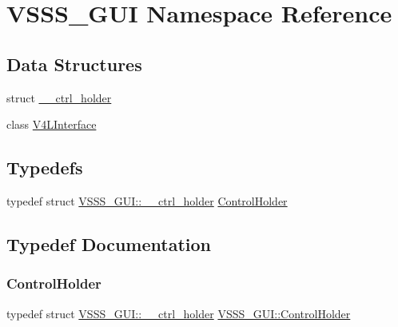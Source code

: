 \hypertarget{namespace_v_s_s_s___g_u_i}{}\section{V\+S\+S\+S\+\_\+\+G\+UI Namespace Reference}
\label{namespace_v_s_s_s___g_u_i}
\subsection*{Data Structures}
\begin{DoxyCompactItemize}
\item 
struct \hyperlink{struct_v_s_s_s___g_u_i_1_1____ctrl__holder}{\+\_\+\+\_\+ctrl\+\_\+holder}
\item 
class \hyperlink{class_v_s_s_s___g_u_i_1_1_v4_l_interface}{V4\+L\+Interface}
\end{DoxyCompactItemize}
\subsection*{Typedefs}
\begin{DoxyCompactItemize}
\item 
typedef struct \hyperlink{struct_v_s_s_s___g_u_i_1_1____ctrl__holder}{V\+S\+S\+S\+\_\+\+G\+U\+I\+::\+\_\+\+\_\+ctrl\+\_\+holder} \hyperlink{namespace_v_s_s_s___g_u_i_a9eff2f5504f050458ee4bcf362482a8d}{Control\+Holder}
\end{DoxyCompactItemize}


\subsection{Typedef Documentation}
\mbox{\label{namespace_v_s_s_s___g_u_i_a9eff2f5504f050458ee4bcf362482a8d}} 
\subsubsection{\texorpdfstring{Control\+Holder}{ControlHolder}}
{\footnotesize\ttfamily typedef struct \hyperlink{struct_v_s_s_s___g_u_i_1_1____ctrl__holder}{V\+S\+S\+S\+\_\+\+G\+U\+I\+::\+\_\+\+\_\+ctrl\+\_\+holder}  \hyperlink{namespace_v_s_s_s___g_u_i_a9eff2f5504f050458ee4bcf362482a8d}{V\+S\+S\+S\+\_\+\+G\+U\+I\+::\+Control\+Holder}}

